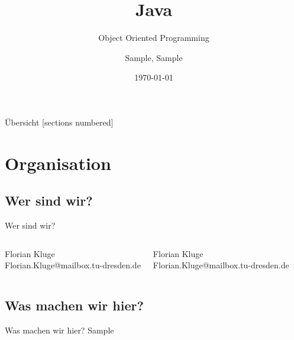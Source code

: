 

\usepackage{tikz}
\usepackage{hyperref}
\hypersetup{
	colorlinks=true,
	linkcolor=darkgray,
	urlcolor=blue,
}


\title{Java}
\subtitle{Object Oriented  Programming}
\date{\today}
\author{Sample, Sample}


\maketitle


\begin{frame}{Übersicht}
	[sections numbered]
	\tableofcontents[hideallsubsections]
\end{frame}



\section{Organisation}

\subsection{Wer sind wir?}
\begin{frame}{Wer sind wir?}

	\begin{columns}
		Florian Kluge\\
		Florian.Kluge@mailbox.tu-dresden.de



		Florian Kluge\\
		Florian.Kluge@mailbox.tu-dresden.de

	\end{columns}

\end{frame}

\subsection{Was machen wir hier?}
\begin{frame}{Was machen wir hier?}
	Sample
\end{frame}


